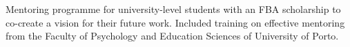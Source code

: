 
\begin{cventries}

    {}
    {}
    {}
    {Mentoring programme for university-level students with an FBA scholarship to co-create a vision for their future work. Included training on effective mentoring from the Faculty of Psychology and Education Sciences of University of Porto.}

\end{cventries}